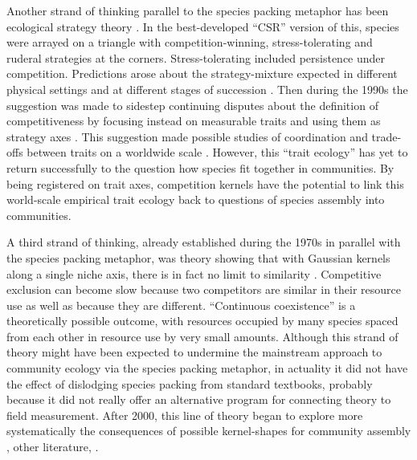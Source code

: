 \documentclass[a4paper,11pt]{article}
\begin{document}
Another strand of thinking parallel to the species packing metaphor has been ecological strategy theory 
\citep[e.g.][]{Grime-1974, Grime-1977, Grime-1979, Grime-1988, Southwood-1977, 
Greenslade-1983}. In the best-developed ``CSR'' version of this, species were arrayed on a triangle with competition-winning, stress-tolerating and ruderal strategies at the corners. Stress-tolerating included persistence under competition. Predictions arose about the strategy-mixture expected in different physical settings and at different stages of succession \citep{Grime-1979,Grime-2001}. Then during the 1990s the suggestion was made to sidestep continuing disputes about the definition of competitiveness by focusing instead on measurable traits and using them as strategy axes \citep{Westoby-1998, Weiher-1999, Westoby-2002}. This suggestion made possible studies of coordination and trade-offs between traits on a worldwide scale \citep[e.g.][]{Wright-2004, Zanne-2010, Cornwell-2014}. However, this ``trait ecology'' has yet to return successfully to the question how species fit together in communities. By being registered on trait axes, competition kernels have the potential to link this world-scale empirical trait ecology back to questions of species assembly into communities.

A third strand of thinking, already established during the 1970s in parallel with the species packing metaphor, was theory showing that with Gaussian kernels along a single niche axis, there is in fact no limit to similarity \citep{May-1972, Abrams-1975, Abrams-1983}. Competitive exclusion can become slow because two competitors are similar in their resource use as well as because they are different. ``Continuous coexistence'' is a theoretically possible outcome, with resources occupied by many species spaced from each other in resource use by very small amounts. Although this strand of theory might have been expected to undermine the mainstream approach to community ecology via the species packing metaphor, in actuality it did not have the effect of dislodging species packing from standard textbooks, probably because it did not really offer an alternative program for connecting theory to field measurement.  After 2000, this line of theory began to explore more systematically the consequences of possible kernel-shapes for community assembly \citep{Scheffer-2006}, other literature, \citep{Leimar-2013}.
\end{document}

